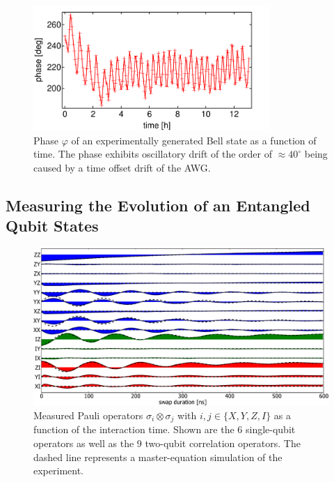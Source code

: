 \begin{figure}
	\centering
	\includegraphics[width=9cm]{"./data/ct5/2011_03_17 - chsh/chsh_drift"}
	\caption[]{Phase $\varphi$ of an experimentally generated Bell state as a function of time. The phase exhibits oscillatory drift of the order of $\approx 40^\circ$ being caused by a time offset drift of the AWG.}
	\label{fig:chsh_drift}
\end{figure}


\subsection{Measuring the Evolution of an Entangled Qubit States}

\begin{figure}[ht!]
   \centering
	 \includegraphics[width=1.\textwidth]{"./data/ct5/film of swap/pauli_set_vs_time_with_simulation"}
	 \caption[test]{Measured Pauli operators $\sigma_i \otimes \sigma_j$ with $i,j \in \{X,Y,Z,I\}$ as a function of the interaction time. Shown are the 6 single-qubit operators as well as the 9 two-qubit correlation operators. The dashed line represents a master-equation simulation of the experiment.}
	 \label{fig:swap_pauli_set_vs_time_with_simulation}
\end{figure}


